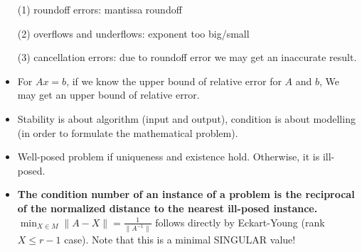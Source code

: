 \documentclass{article}
\theoremstyle{remark}
\begin{document}
\begin{itemize}
(1) roundoff errors: mantissa roundoff

(2) overflows and underflows: exponent too big/small

(3) cancellation errors: due to roundoff error we may get an inaccurate result.

\item For $Ax=b$, if we know the upper bound of relative error for $A$ and $b$, We may get an upper bound of relative error.
\item Stability is about algorithm (input and output), condition is about modelling (in order to formulate the mathematical problem).
\item Well-posed problem if uniqueness and existence hold. Otherwise, it is ill-posed. 
\item \textbf{The condition number of an instance of a problem is the reciprocal of the normalized distance to the nearest ill-posed instance.}
$\min_{X\in M}\lVert A-X\rVert=\frac 1{\lVert A^{-1}\rVert}$ follows directly by Eckart-Young (rank$X\leq r-1$ case). Note that this is a minimal SINGULAR value!


    \end{itemize}
\end{document}
